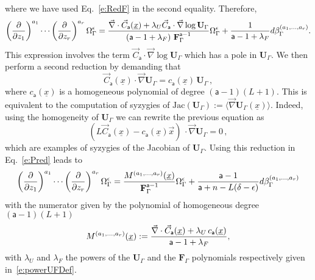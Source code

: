 \documentclass[a4paper,12pt]{article}
\numberwithin{equation}{section}
\numberwithin{figure}{section}
\begin{document}
where we have used Eq.~\eqref{e:RedF} in the second equality. Therefore, 
\begin{equation}
	\label{e:Pred}
\left(\partial\over \partial z_1\right)^{a_1}\cdots\left(\partial
  \over\partial z_r\right)^{a_r} \Omega_\Gamma^\epsilon={
\vec\nabla \cdot \vec C_{\mathsf{a}}
     (\underline x)
+ \lambda_U \vec
    C_{\mathsf{a}}\cdot\vec\nabla\log\mathbf{U}_\Gamma\over \left(\mathsf{a}-1+\lambda_F\right)\,\textbf{F}_\Gamma^{\mathsf{a}-1}}
  \Omega_\Gamma^\epsilon
+{  1\over \mathsf{a}-1+\lambda_F} d\beta_\Gamma^{(a_1,\dots,a_r)}.
\end{equation}
%
This expression involves the term $\vec
    C_{\mathsf{a}}\cdot\vec\nabla\log\mathbf{U}_\Gamma$ which has a
    pole in $\mathbf{U}_\Gamma$. We then perform a second reduction by demanding that
    \begin{equation}
      \label{e:RedU}
      \vec
    C_{\mathsf{a}}(\underline x)\cdot\vec\nabla \mathbf{U}_\Gamma =
    c_{\mathsf{a}}(\underline x) \, \mathbf{U}_\Gamma \, ,
    \end{equation}
where $ c_{\mathsf{a}}(\underline x)$ is a homogeneous polynomial of
degree $(\mathsf{a}-1)(L+1)$. This is equivalent to the computation of
syzygies of $\text{Jac}( \mathbf
U_\Gamma):=\langle \vec\nabla \textbf{U}_\Gamma(\underline x)\rangle$. Indeed,  using the homogeneity of $\mathbf{U}_\Gamma$ we can rewrite the previous equation as 
\begin{equation}
 \left( L   \vec
C_{\mathsf{a}}(\underline x) -
c_{\mathsf{a}}(\underline x) \vec{x} \right) \, \cdot\vec\nabla
\mathbf{U}_\Gamma =0\, ,
\end{equation}
which are examples of syzygies of the Jacobian of $\mathbf U_\Gamma$. Using this reduction in Eq.~\eqref{e:Pred} leads to
% 
\begin{equation}\label{e:RedFinal}
\left(\partial\over \partial z_1\right)^{a_1}\cdots\left(\partial
  \over\partial z_r\right)^{a_r} \Omega_\Gamma^\epsilon={
M^{(a_1,\dots,a_r)}
     (\underline x)
\over \textbf{F}_\Gamma^{\mathsf{a}-1}}\Omega_\Gamma^\epsilon
+{  \mathsf{a}-1\over \mathsf{a}+n-L(\delta-\epsilon)} d\beta_\Gamma^{(a_1,\dots,a_r)}
\end{equation}
with the numerator given by the polynomial of homogeneous degree $(\mathsf{a}-1)(L+1)$
\begin{equation}
  \label{e:Mdimregfinal}
  M^{(a_1,\dots,a_r)}(\underline x):={\vec\nabla \cdot \vec C_{\mathsf{a}}
     (\underline x)
+ \lambda_U\, 
    c_{\mathsf{a}}(\underline x)\over \mathsf{a}-1+\lambda_F },
\end{equation}
with $\lambda_U$ and $\lambda_F$ the powers of the $\textbf{U}_\Gamma$
and the $\textbf{F}_\Gamma$ polynomials respectively given in~\eqref{e:powerUFDef}.
%
\end{document}
